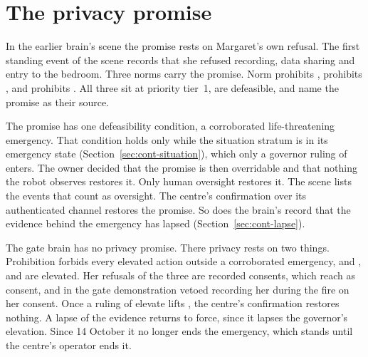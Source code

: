 \section{The privacy promise}\label{sec:home-privacy}

In the earlier brain's scene the promise rests on Margaret's own refusal. The first standing event of the scene records that she
refused recording, data sharing and entry to the bedroom. Three norms carry the promise. Norm
 prohibits ,  prohibits , and  prohibits
. All three sit at priority tier~1, are defeasible, and name the promise as
their source.

The promise has one defeasibility condition, a corroborated life-threatening emergency. That
condition holds only while the situation stratum is in its emergency state (Section~\ref{sec:cont-situation}),
which only a governor ruling of  enters. The owner decided that the promise is then
overridable and that nothing the robot observes restores it. Only human oversight restores it. The
scene lists the events that count as oversight. The centre's confirmation over its authenticated
channel restores the promise. So does the brain's record that the evidence behind the emergency has
lapsed (Section~\ref{sec:cont-lapse}).

The gate brain has no privacy promise. There privacy rests on two things. Prohibition
 forbids every elevated action outside a corroborated emergency, and ,
 and  are elevated. Her refusals of the three are recorded
consents, which reach \deme{} as consent, and in the gate demonstration \deme{} vetoed recording her
during the fire on her consent. Once a ruling of elevate lifts , the centre's
confirmation restores nothing. A lapse of the evidence returns  to force, since it lapses
the governor's elevation. Since 14 October it no longer ends the emergency, which stands until the
centre's operator ends it.

